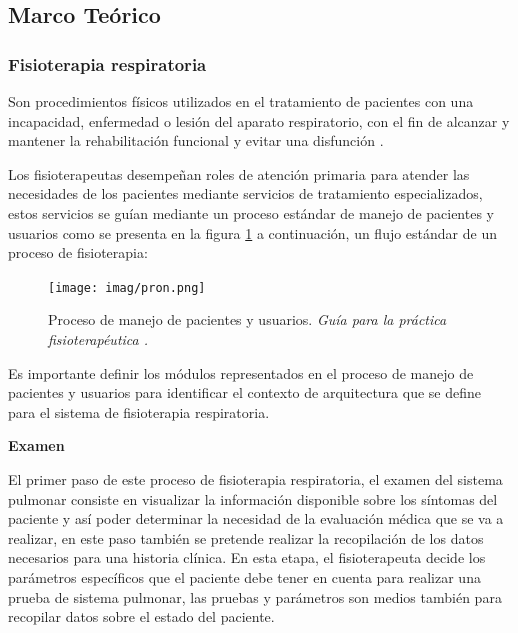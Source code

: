 \documentclass[12pt]{article}
\begin{document}
\subsection{Marco Teórico}

\subsubsection{Fisioterapia respiratoria}

Son procedimientos físicos utilizados en el tratamiento de pacientes con una incapacidad, enfermedad o lesión del aparato respiratorio, con el fin de alcanzar y mantener la rehabilitación funcional y evitar una disfunción \cite{26}. 

Los fisioterapeutas desempeñan roles de atención primaria  para atender las necesidades de los pacientes mediante servicios de tratamiento especializados, estos servicios se guían mediante un proceso estándar de manejo de pacientes y usuarios como se presenta en la figura \ref{1} a continuación, un flujo estándar de un proceso de fisioterapia:



\begin{figure}[ht]
\centering
\texttt{[image: imag/pron.png]}
\caption{Proceso de manejo de pacientes y usuarios. \textit{Guía para la práctica fisioterapéutica \cite{5}.}}
\label{1}
\end{figure}
\FloatBarrier

Es importante definir los módulos representados en el proceso de manejo de pacientes y usuarios para identificar el contexto de arquitectura que se define para el sistema de fisioterapia respiratoria.

\textbf{Examen}

El primer paso de este proceso de fisioterapia respiratoria, el examen del sistema pulmonar consiste en visualizar la información disponible sobre los síntomas del paciente y así poder determinar la necesidad de la evaluación médica que se va a realizar, en este paso también se pretende realizar la recopilación de los datos necesarios para una historia clínica. En esta etapa, el fisioterapeuta decide los parámetros específicos que el paciente debe tener en cuenta para realizar una prueba de sistema pulmonar, las pruebas y parámetros son medios también para recopilar datos sobre el estado del paciente. 
\end{document}
